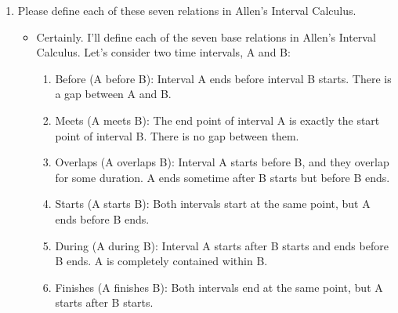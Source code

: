\documentclass[11pt]{article}
\begin{document}
\begin{enumerate}
\begin{itemize}
      \item Certainly. If we consider only the base relations without their inverses, we can reduce James Allen's Interval Calculus to 7 fundamental relations. Here they are:
        \begin{enumerate}
          \item Before
          \item Meets
          \item Overlaps
          \item Starts
          \item During
          \item Finishes
          \item Equals
        \end{enumerate}
These 7 relations form the core of Allen's Interval Calculus. The other 6 relations in the full set of 13 are inverses of these (except for "Equals," which is its own inverse).
Would you like me to explain how these relations are defined or provide examples of their use in temporal reasoning?
    \end{itemize}
  \item Please define each of these seven relations in Allen's Interval Calculus.
    \begin{itemize}
      \item Certainly. I'll define each of the seven base relations in Allen's Interval Calculus. Let's consider two time intervals, A and B:
        \begin{enumerate}
          \item Before (A before B):
            Interval A ends before interval B starts. There is a gap between A and B.
          \item Meets (A meets B):
            The end point of interval A is exactly the start point of interval B. There is no gap between them.
          \item Overlaps (A overlaps B):
            Interval A starts before B, and they overlap for some duration. A ends sometime after B starts but before B ends.
          \item Starts (A starts B):
            Both intervals start at the same point, but A ends before B ends.
          \item During (A during B):
            Interval A starts after B starts and ends before B ends. A is completely contained within B.
          \item Finishes (A finishes B):
            Both intervals end at the same point, but A starts after B starts.

\end{enumerate}
\end{itemize}
\end{enumerate}
\end{document}
